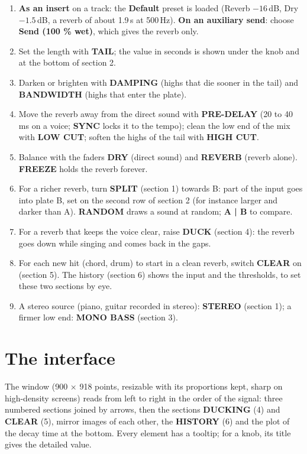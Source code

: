\documentclass[a4paper,11pt]{article}
\newcommand{\ctl}[1]{\textsf{\textbf{#1}}}   %
\newcommand{\dB}{\,dB}
\begin{document}
\begin{enumerate}
\item \textbf{As an insert} on a track: the \ctl{Default} preset is loaded (Reverb $-16$\dB, Dry
  $-1.5$\dB, a reverb of about 1.9\,s at 500\,Hz). \textbf{On an auxiliary send}: choose
  \ctl{Send (100 \% wet)}, which gives the reverb only.
\item Set the length with \ctl{TAIL}; the value in seconds is shown under the knob and at
  the bottom of section 2.
\item Darken or brighten with \ctl{DAMPING} (highs that die sooner in the tail) and
  \ctl{BANDWIDTH} (highs that enter the plate).
\item Move the reverb away from the direct sound with \ctl{PRE-DELAY} (20 to 40\,ms on a
  voice; \ctl{SYNC} locks it to the tempo); clean the low end of the mix with \ctl{LOW CUT};
  soften the highs of the tail with \ctl{HIGH CUT}.
\item Balance with the faders \ctl{DRY} (direct sound) and \ctl{REVERB} (reverb alone).
  \ctl{FREEZE} holds the reverb forever.
\item For a richer reverb, turn \ctl{SPLIT} (section 1) towards B: part of the input goes into
  plate B, set on the second row of section 2 (for instance larger and darker than A).
  \ctl{RANDOM} draws a sound at random; \ctl{A | B} to compare.
\item For a reverb that keeps the voice clear, raise \ctl{DUCK} (section 4): the reverb goes
  down while singing and comes back in the gaps.
\item For each new hit (chord, drum) to start in a clean reverb, switch \ctl{CLEAR} on
  (section 5). The history (section 6) shows the input and the thresholds, to set these two
  sections by eye.
\item A stereo source (piano, guitar recorded in stereo): \ctl{STEREO} (section 1); a firmer
  low end: \ctl{MONO BASS} (section 3).
\end{enumerate}

\section{The interface}

The window (900 × 918 points, resizable with its proportions kept, sharp on high-density
screens) reads from left to right in the order of the signal: three numbered sections joined by
arrows, then the sections \ctl{DUCKING} (4) and \ctl{CLEAR} (5), mirror images of each other,
the \ctl{HISTORY} (6) and the
plot of the decay time at the bottom. Every element has a tooltip; for a knob, its title gives
the detailed value.
\end{document}
